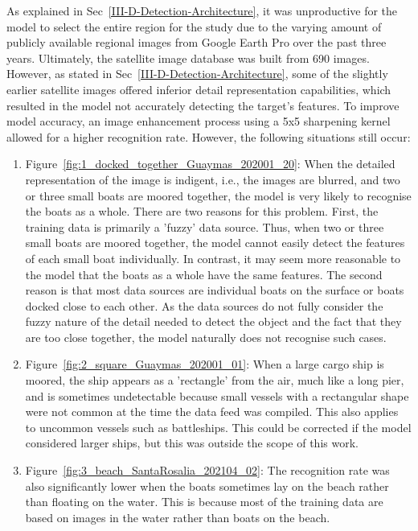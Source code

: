 As explained in Sec~\ref{III-D-Detection-Architecture}, it was unproductive for the model to select the entire region for the study due to the varying amount of publicly available regional images from Google Earth Pro over the past three years. Ultimately, the satellite image database was built from 690 images. However, as stated in Sec~\ref{III-D-Detection-Architecture}, some of the slightly earlier satellite images offered inferior detail representation capabilities, which resulted in the model not accurately detecting the target's features. To improve model accuracy, an image enhancement process using a 5x5 sharpening kernel allowed for a higher recognition rate. However, the following situations still occur:

\begin{enumerate}
    \item Figure~\ref{fig:1_docked_together_Guaymas_202001_20}: When the detailed representation of the image is indigent, i.e., the images are blurred, and two or three small boats are moored together, the model is very likely to recognise the boats as a whole. There are two reasons for this problem. First, the training data is primarily a 'fuzzy' data source. Thus, when two or three small boats are moored together, the model cannot easily detect the features of each small boat individually. In contrast, it may seem more reasonable to the model that the boats as a whole have the same features. The second reason is that most data sources are individual boats on the surface or boats docked close to each other. As the data sources do not fully consider the fuzzy nature of the detail needed to detect the object and the fact that they are too close together, the model naturally does not recognise such cases.

    
    \item Figure~\ref{fig:2_square_Guaymas_202001_01}: When a large cargo ship is moored, the ship appears as a 'rectangle' from the air, much like a long pier, and is sometimes undetectable because small vessels with a rectangular shape were not common at the time the data feed was compiled. This also applies to uncommon vessels such as battleships. This could be corrected if the model considered larger ships, but this was outside the scope of this work.

    \item Figure~\ref{fig:3_beach_SantaRosalia_202104_02}: The recognition rate was also significantly lower when the boats sometimes lay on the beach rather than floating on the water. This is because most of the training data are based on images in the water rather than boats on the beach.

\end{enumerate}

